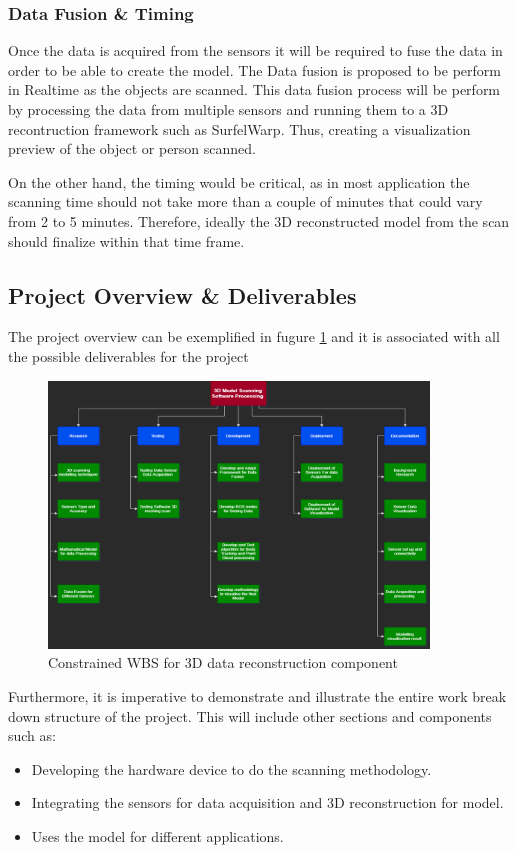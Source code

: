 \documentclass[12pt]{report}
\begin{document}
\subsubsection{Data Fusion \& Timing}
Once the data is acquired from the sensors it will be required to  fuse the data in order to be able to create the model.
The Data fusion is proposed to be perform in Realtime as the objects are scanned. This data fusion process will be perform by processing the data from multiple sensors and running them to a 3D recontruction framework such as SurfelWarp. 
Thus, creating a visualization preview of the object or person scanned. 

On the other hand, the timing would be critical, as in most application the scanning time should not take more than a couple of minutes that could vary from 2 to 5 minutes.
Therefore, ideally the 3D reconstructed model from the scan  should finalize within that time frame.

\subsection{Project Overview \& Deliverables}
The project overview can be exemplified in fugure \ref{fig:ConstrainedWBS} and it is associated with all the possible deliverables for the project
\begin{figure}[h]
  \centering
  \includegraphics[width=0.9\textwidth]{ConstrainedWBS.png}
  \caption{Constrained WBS for 3D data reconstruction component}
  \label{fig:ConstrainedWBS}
\end{figure}

Furthermore, it is imperative to demonstrate and illustrate the entire work break down structure of the project. This will include other sections and components such as: 
\begin{itemize}
  \item Developing the hardware device to do the scanning methodology. 
  \item Integrating the sensors for data acquisition and 3D reconstruction for model.
  \item Uses the model for different applications. 
\end{itemize}
\end{document}
